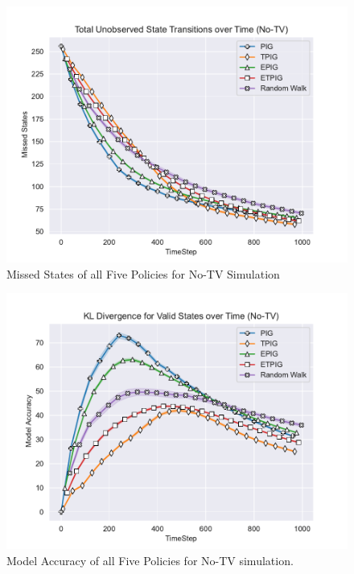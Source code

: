 \documentclass[12pt]{thesis}
\begin{document}
\begin{figure}[p]
	\begin{center}
		\includegraphics[scale=0.8]{"images/Missed_States_No-TV.pdf"}
	\end{center}
	\caption{Missed States of all Five Policies for No-TV Simulation}
	\label{Fig:MSFP0TV}
\end{figure}
\begin{figure}
	\begin{center}
		\includegraphics[scale=0.8]{"images/Model_Accuracy_No-TV.pdf"}
	\end{center}
	\caption{Model Accuracy of all Five Policies for No-TV simulation.}
	\label{Fig:MAFP0TV}
\end{figure}
\end{document}
